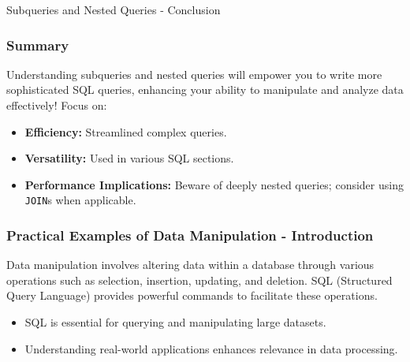 \documentclass[aspectratio=169]{beamer}
\begin{document}
\begin{frame}[fragile]{Subqueries and Nested Queries - Conclusion}
    \frametitle{Summary}
    Understanding subqueries and nested queries will empower you to write more sophisticated SQL queries, 
    enhancing your ability to manipulate and analyze data effectively! Focus on:
    \begin{itemize}
        \item \textbf{Efficiency:} Streamlined complex queries.
        \item \textbf{Versatility:} Used in various SQL sections.
        \item \textbf{Performance Implications:} Beware of deeply nested queries; consider using \texttt{JOIN}s when applicable.
    \end{itemize}
\end{frame}

\begin{frame}[fragile]
    \frametitle{Practical Examples of Data Manipulation - Introduction}
    Data manipulation involves altering data within a database through various operations such as selection, insertion, updating, and deletion. SQL (Structured Query Language) provides powerful commands to facilitate these operations.
    
    \begin{itemize}
        \item SQL is essential for querying and manipulating large datasets.
        \item Understanding real-world applications enhances relevance in data processing.
    \end{itemize}
\end{frame}
\end{document}
